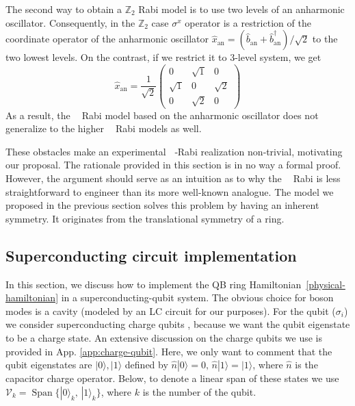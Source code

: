 \documentclass[reprint, aps, prx, amsmath, amssymb, longbibliography, superscriptaddress]{revtex4-2}
\DeclareMathOperator{\Zn}{\mathbb{Z}_n}
\DeclareMathOperator{\Zthree}{\mathbb{Z}_3}
\DeclareMathOperator{\Ztwo}{\mathbb{Z}_2}
\begin{document}
The second way to obtain a $\mathbb{Z}_2$ Rabi model is to use two levels of an anharmonic oscillator. Consequently, in the $\mathbb{Z}_2$ case $\sigma^x$ operator is a restriction of the coordinate operator of the anharmonic oscillator $ \hat x_{\text{an}} = (\hat b_{\text{an}} + \hat b_{\text{an}}^{\dagger})/\sqrt{2} $ to the two lowest levels. On the contrast, if we restrict it to 3-level system, we get
\begin{equation}
    \hat x_{\text{an}} = \frac{1}{\sqrt{2}}\begin{pmatrix} 0 & \sqrt{1} & 0 \\ \sqrt{1} & 0 & \sqrt{2} \\ 0 & \sqrt{2} & 0 \end{pmatrix}
\end{equation}
As a result, the $\Ztwo$ Rabi model based on the anharmonic oscillator does not generalize to the higher $\Zn$ Rabi models as well.

These obstacles make an experimental $\Zn$‑Rabi realization non‑trivial, motivating our proposal. The rationale provided in this section is in no way a formal proof. However, the argument should serve as an intuition as to why the $\Zthree$ Rabi is less straightforward to engineer than its more well-known analogue. The model we proposed in the previous section solves this problem by having an inherent $\Zthree$ symmetry. It originates from the translational symmetry of a ring.

\subsection{Superconducting circuit implementation}
\label{superconducting-implementation}

In this section, we discuss how to implement the QB ring Hamiltonian~\eqref{physical-hamiltonian} in a superconducting-qubit system. The obvious choice for boson modes is a cavity (modeled by an LC circuit for our purposes). For the qubit ($\sigma_i$)  we consider superconducting charge qubits \cite{bouchiat_quantum_1998,nakamura_coherent_1999,lehnert_measurement_2003,makhlin_quantumstate_2001}, because we want the qubit eigenstate to be a charge state. An extensive discussion on the charge qubits we use is provided in App. \ref{app:charge-qubit}. Here, we only want to comment that the qubit eigenstates are $|0\rangle, |1\rangle$ defined by $\hat n |0\rangle = 0, \, \hat n |1\rangle = |1\rangle$, where $\hat n$ is the capacitor charge operator. Below, to denote a linear span of these states we use $\mathcal{V}_k = \operatorname{Span}\{|0\rangle_k, \, |1\rangle_k\}$, where $k$ is the number of the qubit.
\end{document}

